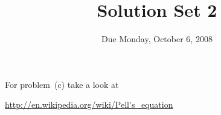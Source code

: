 \documentclass[12pt]{article}
\title{Solution Set 2}
\date{Due Monday, October 6, 2008}
\begin{document}
\maketitle

For problem~(c) take a look at 

\url{http://en.wikipedia.org/wiki/Pell's_equation}
\end{document}
